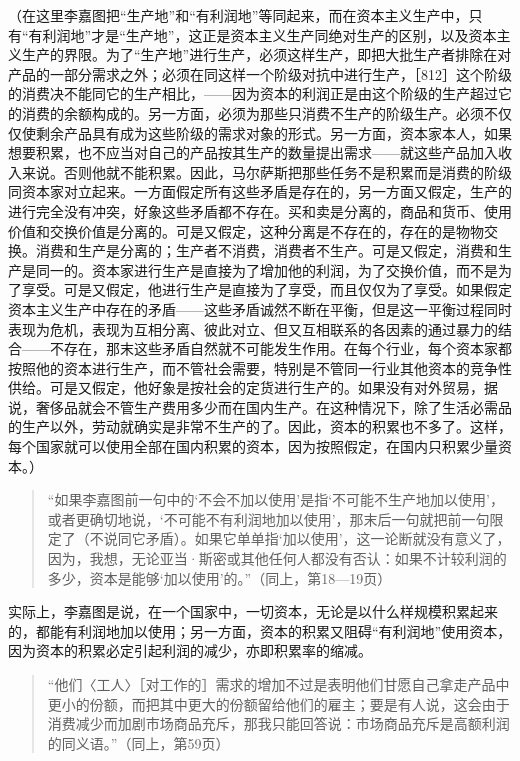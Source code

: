 （在这里李嘉图把“生产地”和“有利润地”等同起来，而在资本主义生产中，只有“有利润地”才是“生产地”，这正是资本主义生产同绝对生产的区别，以及资本主义生产的界限。为了“生产地”进行生产，必须这样生产，即把大批生产者排除在对产品的一部分需求之外；必须在同这样一个阶级对抗中进行生产，［812］这个阶级的消费决不能同它的生产相比，——因为资本的利润正是由这个阶级的生产超过它的消费的余额构成的。另一方面，必须为那些只消费不生产的阶级生产。必须不仅仅使剩余产品具有成为这些阶级的需求对象的形式。另一方面，资本家本人，如果想要积累，也不应当对自己的产品按其生产的数量提出需求——就这些产品加入收入来说。否则他就不能积累。因此，马尔萨斯把那些任务不是积累而是消费的阶级同资本家对立起来。一方面假定所有这些矛盾是存在的，另一方面又假定，生产的进行完全没有冲突，好象这些矛盾都不存在。买和卖是分离的，商品和货币、使用价值和交换价值是分离的。可是又假定，这种分离是不存在的，存在的是物物交换。消费和生产是分离的；生产者不消费，消费者不生产。可是又假定，消费和生产是同一的。资本家进行生产是直接为了增加他的利润，为了交换价值，而不是为了享受。可是又假定，他进行生产是直接为了享受，而且仅仅为了享受。如果假定资本主义生产中存在的矛盾——这些矛盾诚然不断在平衡，但是这一平衡过程同时表现为危机，表现为互相分离、彼此对立、但又互相联系的各因素的通过暴力的结合——不存在，那末这些矛盾自然就不可能发生作用。在每个行业，每个资本家都按照他的资本进行生产，而不管社会需要，特别是不管同一行业其他资本的竞争性供给。可是又假定，他好象是按社会的定货进行生产的。如果没有对外贸易，据说，奢侈品就会不管生产费用多少而在国内生产。在这种情况下，除了生活必需品的生产以外，劳动就确实是非常不生产的了。因此，资本的积累也不多了。这样，每个国家就可以使用全部在国内积累的资本，因为按照假定，在国内只积累少量资本。）

\begin{quote}{“如果李嘉图前一句中的‘不会不加以使用’是指‘不可能不生产地加以使用’，或者更确切地说，‘不可能不有利润地加以使用’，那末后一句就把前一句限定了（不说同它矛盾）。如果它单单指‘加以使用’，这一论断就没有意义了，因为，我想，无论亚当·斯密或其他任何人都没有否认：如果不计较利润的多少，资本是能够‘加以使用’的。”（同上，第18—19页）}\end{quote}

实际上，李嘉图是说，在一个国家中，一切资本，无论是以什么样规模积累起来的，都能有利润地加以使用；另一方面，资本的积累又阻碍“有利润地”使用资本，因为资本的积累必定引起利润的减少，亦即积累率的缩减。

\begin{quote}{“他们〈工人〉［对工作的］需求的增加不过是表明他们甘愿自己拿走产品中更小的份额，而把其中更大的份额留给他们的雇主；要是有人说，这会由于消费减少而加剧市场商品充斥，那我只能回答说：市场商品充斥是高额利润的同义语。”（同上，第59页）}\end{quote}

